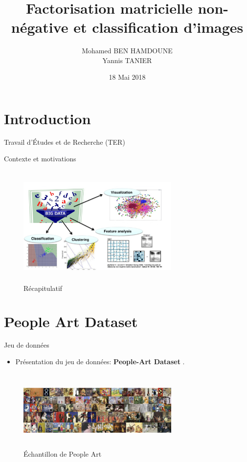 \documentclass{beamer}
\title[TER]{Factorisation matricielle non-n\'egative et classification d'images}
\author[M. BEN HAMDOUNE Y. TANNIER]{Mohamed BEN HAMDOUNE \\ Yannis TANIER}
\institute[]{\bf Université Paris-Descartes}
\date{18 Mai 2018}
\begin{document}
\begin{frame}
  \titlepage
\end{frame}

\section{Introduction}
\begin{frame}{Travail d'\'Etudes et de Recherche (TER)}

\begin{block}{Contexte et motivations}
\end{block}

\begin{figure}
\includegraphics[width=8cm ,height= 6cm]{resume_introduction.png}
\caption{\label{fig:your-figure}Récapitulatif}
\end{figure}

\end{frame}

\section{People Art Dataset}
\begin{frame}{Jeu de données}

\begin{itemize}
  \item Présentation du jeu de données: \textbf{People-Art Dataset} .    
\end{itemize}
\begin{figure}
\includegraphics[width=8cm ,height= 4cm]{panel_dataset.png}
\caption{\label{fig:your-figure}\'Echantillon de People Art}
\end{figure}
\end{frame}
\end{document}
